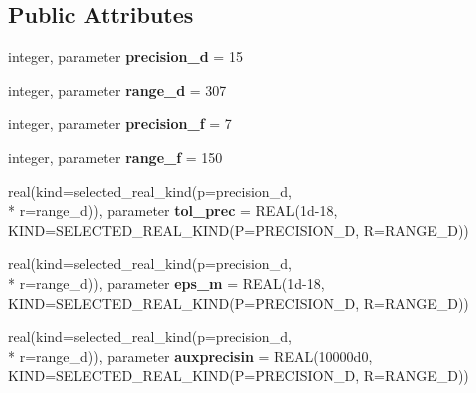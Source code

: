 \subsection*{Public Attributes}
\begin{DoxyCompactItemize}
\item 
\hypertarget{classscattersearchtypes_a8ada11d61a069aebb7661eef2241519b}{integer, parameter {\bfseries precision\-\_\-d} = 15}\label{classscattersearchtypes_a8ada11d61a069aebb7661eef2241519b}

\item 
\hypertarget{classscattersearchtypes_a87270fc877bff741b876df7442277706}{integer, parameter {\bfseries range\-\_\-d} = 307}\label{classscattersearchtypes_a87270fc877bff741b876df7442277706}

\item 
\hypertarget{classscattersearchtypes_a7aa2b5724f67acc9b93a2b5cda7361ac}{integer, parameter {\bfseries precision\-\_\-f} = 7}\label{classscattersearchtypes_a7aa2b5724f67acc9b93a2b5cda7361ac}

\item 
\hypertarget{classscattersearchtypes_a3084b02d68540c9c7fc516eff320055f}{integer, parameter {\bfseries range\-\_\-f} = 150}\label{classscattersearchtypes_a3084b02d68540c9c7fc516eff320055f}

\item 
\hypertarget{classscattersearchtypes_a9b7585bbead61a31c1d90727eb36aedd}{real(kind=selected\-\_\-real\-\_\-kind(p=precision\-\_\-d, \\*
r=range\-\_\-d)), parameter {\bfseries tol\-\_\-prec} = R\-E\-A\-L(1d-\/18, K\-I\-N\-D=\-S\-E\-L\-E\-C\-T\-E\-D\-\_\-\-R\-E\-A\-L\-\_\-\-K\-I\-N\-D(\-P=\-P\-R\-E\-C\-I\-S\-I\-O\-N\-\_\-\-D, R=\-R\-A\-N\-G\-E\-\_\-\-D))}\label{classscattersearchtypes_a9b7585bbead61a31c1d90727eb36aedd}

\item 
\hypertarget{classscattersearchtypes_a5c5ed9d48ae975d815c4a876b08d13a2}{real(kind=selected\-\_\-real\-\_\-kind(p=precision\-\_\-d, \\*
r=range\-\_\-d)), parameter {\bfseries eps\-\_\-m} = R\-E\-A\-L(1d-\/18, K\-I\-N\-D=\-S\-E\-L\-E\-C\-T\-E\-D\-\_\-\-R\-E\-A\-L\-\_\-\-K\-I\-N\-D(\-P=\-P\-R\-E\-C\-I\-S\-I\-O\-N\-\_\-\-D, R=\-R\-A\-N\-G\-E\-\_\-\-D))}\label{classscattersearchtypes_a5c5ed9d48ae975d815c4a876b08d13a2}

\item 
\hypertarget{classscattersearchtypes_a7b68194480b29084ad2e2884554d8ede}{real(kind=selected\-\_\-real\-\_\-kind(p=precision\-\_\-d, \\*
r=range\-\_\-d)), parameter {\bfseries auxprecisin} = R\-E\-A\-L(10000d0, K\-I\-N\-D=\-S\-E\-L\-E\-C\-T\-E\-D\-\_\-\-R\-E\-A\-L\-\_\-\-K\-I\-N\-D(\-P=\-P\-R\-E\-C\-I\-S\-I\-O\-N\-\_\-\-D, R=\-R\-A\-N\-G\-E\-\_\-\-D))}\label{classscattersearchtypes_a7b68194480b29084ad2e2884554d8ede}


\end{DoxyCompactItemize}
